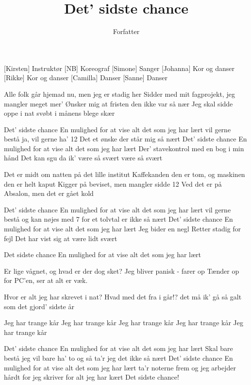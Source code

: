 \documentclass[a4paper,11pt]{article}
\title{Det' sidste chance}
\author{Forfatter}
\begin{document}
\maketitle

\begin{roles}
[Kirsten] Instruktør
[NB] Koreograf
[Simone] Sanger
[Johanna] Kor og danser
[Rikke] Kor og danser
[Camilla] Danser
[Sanne] Danser
\end{roles}

\begin{song}
 Alle folk går hjemad nu, men jeg er stadig her
Sidder med mit fagprojekt, jeg mangler meget mer'
Ønsker mig at fristen den ikke var så nær
Jeg skal sidde oppe i nat svøbt i månens blege skær

Det' sidste chance
En mulighed for at vise alt det som jeg har lært
vil gerne bestå
ja, vil gerne ha' 12
Det et ønske der står mig så nært
Det' sidste chance
En mulighed for at vise alt det som jeg har lært
Der' stavekontrol
med en bog i min hånd
Det kan sgu da ik' være så svært
være så svært

Det er midt om natten på det lille institut
Kaffekanden den er tom, og maskinen den er helt kaput
Kigger på beviset, men mangler sidde 12
Ved det er på Absalon, men det er gået kold

Det' sidste chance
En mulighed for at vise alt det som jeg har lært
vil gerne bestå
og kan nøjes med 7
for et tolvtal er ikke så nært
Det' sidste chance
En mulighed for at vise alt det som jeg har lært
Jeg bider en negl
Retter stadig for fejl
Det har vist sig at være lidt svært

Det sidste chance
En mulighed for at vise alt det som jeg har lært

Er lige vågnet, og hvad er der dog sket?
Jeg bliver panisk - farer op
Tænder op for PC'en, ser at alt er væk.

Hvor er alt jeg har skrevet i nat?
Hvad med det fra i går!?
det må ik' gå så galt som det gjord' sidste år

Jeg har trange kår
Jeg har trange kår
Jeg har trange kår
Jeg har trange kår
Jeg har trange kår

Det' sidste chance
En mulighed for at vise alt det som jeg har lært
Skal bare bestå
jeg vil bare ha' to
og så ta'r jeg det ikke så nært
Det' sidste chance
En mulighed for at vise alt det som jeg har lært
ta'r noterne frem
og jeg arbejder hårdt
for jeg skriver for alt jeg har kært
Det sidste chance!
\end{song}
\end{document}
